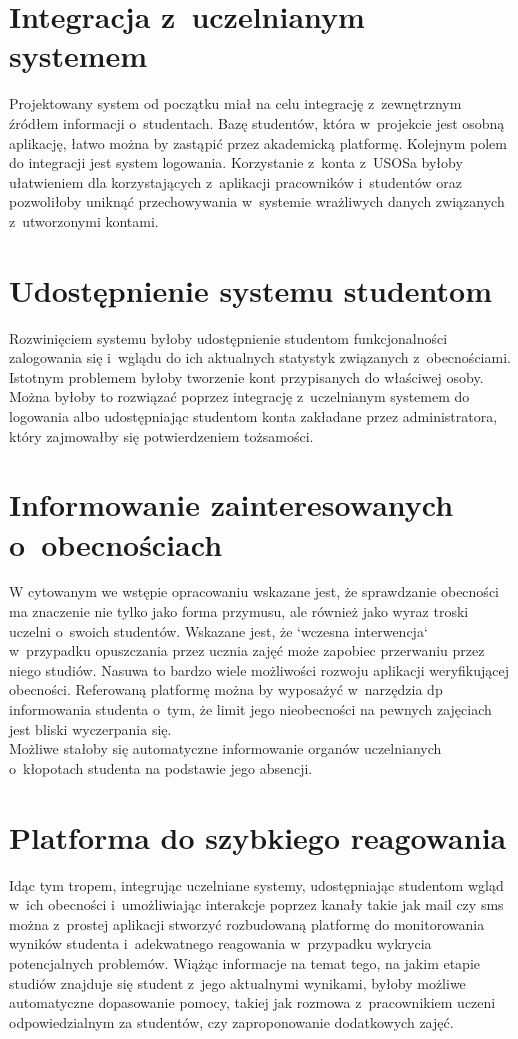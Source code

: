 \documentclass[declaration,shortabstract, mgr]{iithesis}
\begin{document}
\section{Integracja z~uczelnianym systemem}
\indent Projektowany system od początku miał na celu integrację z~zewnętrznym źródłem informacji o~studentach. Bazę studentów, która w~projekcie jest osobną aplikację, łatwo można by zastąpić przez akademicką platformę. Kolejnym polem do integracji jest system logowania. Korzystanie z~konta z~USOSa byłoby ułatwieniem dla korzystających z~aplikacji pracowników i~studentów oraz pozwoliłoby uniknąć przechowywania w~systemie wrażliwych danych związanych z~utworzonymi kontami.
\section{Udostępnienie systemu studentom}
\indent Rozwinięciem systemu byłoby udostępnienie studentom funkcjonalności zalogowania się i~wglądu do ich aktualnych statystyk związanych z~obecnościami. Istotnym problemem byłoby tworzenie kont przypisanych do właściwej osoby. Można byłoby to rozwiązać poprzez integrację z~uczelnianym systemem do logowania albo udostępniając studentom konta zakładane przez administratora, który zajmowałby się potwierdzeniem tożsamości.
\section{Informowanie zainteresowanych o~obecnościach}
\indent W cytowanym we wstępie opracowaniu\cite{theory_base} wskazane jest, że sprawdzanie obecności ma znaczenie nie tylko jako forma przymusu, ale również jako wyraz troski uczelni o~swoich studentów. Wskazane jest, że `wczesna interwencja` w~przypadku opuszczania przez ucznia zajęć może zapobiec przerwaniu przez niego studiów. Nasuwa to bardzo wiele możliwości rozwoju aplikacji weryfikującej obecności. Referowaną platformę można by wyposażyć w~narzędzia dp informowania studenta o~tym, że limit jego nieobecności na pewnych zajęciach jest bliski wyczerpania się. \\
\indent Możliwe stałoby się automatyczne informowanie organów uczelnianych o~kłopotach studenta na podstawie jego absencji. \\
\section{Platforma do szybkiego reagowania}
\indent Idąc tym tropem, integrując uczelniane systemy, udostępniając studentom wgląd w~ich obecności i~umożliwiając interakcje poprzez kanały takie jak mail czy sms można z~prostej aplikacji stworzyć rozbudowaną platformę do monitorowania wyników studenta i~adekwatnego reagowania w~przypadku wykrycia potencjalnych problemów. Wiążąc informacje na temat tego, na jakim etapie studiów znajduje się student z~jego aktualnymi wynikami, byłoby możliwe automatyczne dopasowanie pomocy, takiej jak rozmowa z~pracownikiem uczeni odpowiedzialnym za studentów, czy zaproponowanie dodatkowych zajęć.
\end{document}
